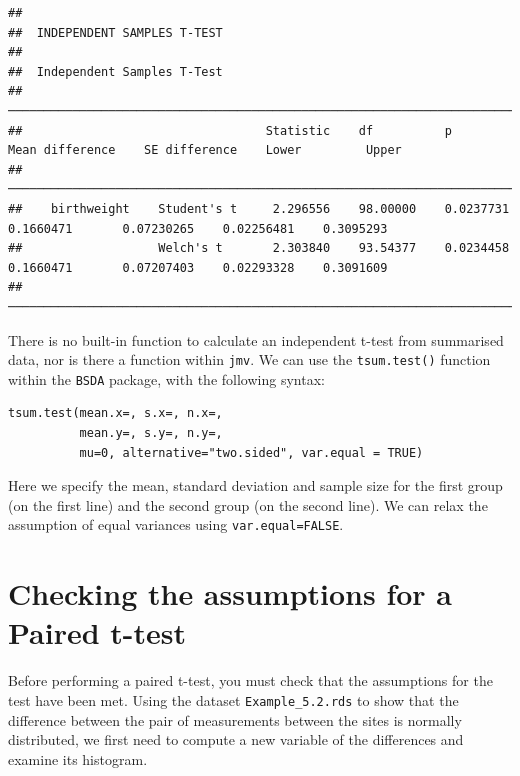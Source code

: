 \documentclass[
]{memoir}
\begin{document}
\begin{verbatim}
## 
##  INDEPENDENT SAMPLES T-TEST
## 
##  Independent Samples T-Test                                                                                                          
##  ─────────────────────────────────────────────────────────────────────────────────────────────────────────────────────────────────── 
##                                  Statistic    df          p            Mean difference    SE difference    Lower         Upper       
##  ─────────────────────────────────────────────────────────────────────────────────────────────────────────────────────────────────── 
##    birthweight    Student's t     2.296556    98.00000    0.0237731          0.1660471       0.07230265    0.02256481    0.3095293   
##                   Welch's t       2.303840    93.54377    0.0234458          0.1660471       0.07207403    0.02293328    0.3091609   
##  ───────────────────────────────────────────────────────────────────────────────────────────────────────────────────────────────────
\end{verbatim}

There is no built-in function to calculate an independent t-test from summarised data, nor is there a function within \texttt{jmv}. We can use the \texttt{tsum.test()} function within the \texttt{BSDA} package, with the following syntax:

\begin{verbatim}
tsum.test(mean.x=, s.x=, n.x=,
          mean.y=, s.y=, n.y=,
          mu=0, alternative="two.sided", var.equal = TRUE)
\end{verbatim}

Here we specify the mean, standard deviation and sample size for the first group (on the first line) and the second group (on the second line). We can relax the assumption of equal variances using \texttt{var.equal=FALSE}.

\hypertarget{checking-the-assumptions-for-a-paired-t-test}{%
\section{Checking the assumptions for a Paired t-test}\label{checking-the-assumptions-for-a-paired-t-test}}

Before performing a paired t-test, you must check that the assumptions for the test have been met. Using the dataset \texttt{Example\_5.2.rds} to show that the difference between the pair of measurements between the sites is normally distributed, we first need to compute a new variable of the differences and examine its histogram.
\end{document}
